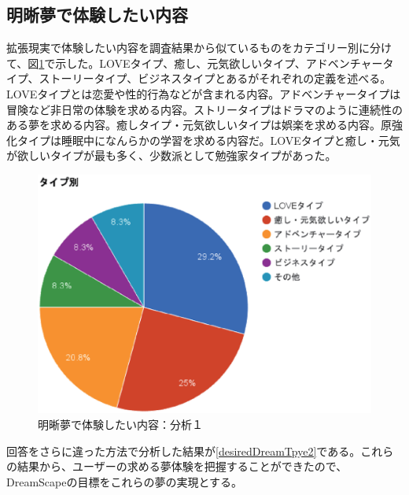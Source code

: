 \subsection{明晰夢で体験したい内容}
拡張現実で体験したい内容を調査結果から似ているものをカテゴリー別に分けて、図\ref{desiredDreamTpye}で示した。LOVEタイプ、癒し、元気欲しいタイプ、アドベンチャータイプ、ストーリータイプ、ビジネスタイプとあるがそれぞれの定義を述べる。LOVEタイプとは恋愛や性的行為などが含まれる内容。アドベンチャータイプは冒険など非日常の体験を求める内容。ストリータイプはドラマのように連続性のある夢を求める内容。癒しタイプ・元気欲しいタイプは娯楽を求める内容。原強化タイプは睡眠中になんらかの学習を求める内容だ。LOVEタイプと癒し・元気が欲しいタイプが最も多く、少数派として勉強家タイプがあった。

\begin{figure}[htbp]
\begin{center}
\includegraphics[width=15cm]{eps/dreamType.eps}
\caption{明晰夢で体験したい内容：分析１}
\label{desiredDreamTpye}
\end{center}
\end{figure}

回答をさらに違った方法で分析した結果が\ref{desiredDreamTpye2}である。これらの結果から、ユーザーの求める夢体験を把握することができたので、DreamScapeの目標をこれらの夢の実現とする。

